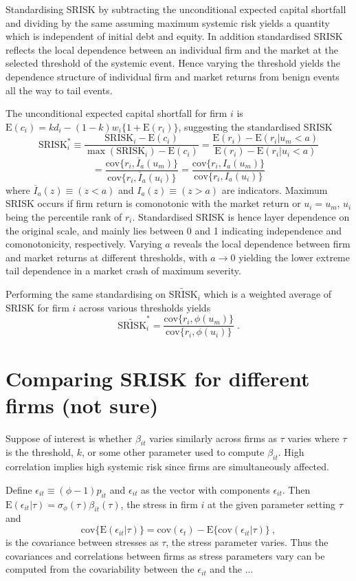\documentclass[authoryear]{elsarticle}
\newcommand{\E}{\mathrm{E}}
\newcommand{\cov}{\mathrm{cov}}
\newcommand{\eps}{\epsilon}
\begin{document}
Standardising SRISK by subtracting the unconditional expected capital shortfall and dividing by the same assuming maximum systemic risk yields a quantity which is independent of initial debt and equity. In addition standardised SRISK reflects the local dependence between an individual firm and the market at the selected threshold of the systemic event. Hence varying the threshold yields the dependence structure of individual firm and market returns from benign events all the way to tail events.

The unconditional expected capital shortfall for firm $i$ is $\E(c_i)=kd_i-(1-k)w_i\{1+\E(r_i)\}$, suggesting the standardised SRISK
$$
\mathrm{SRISK}_i^* \equiv \frac{\mathrm{SRISK}_i-\E(c_i)}{\max(\mathrm{SRISK}_i)-\E(c_i)}
=\frac{\E(r_i)-\E(r_i|u_m<a)}{\E(r_i)-\E(r_i|u_i<a)}
$$
$$
=\frac{\cov\{r_i,\overline{I}_a(u_m)\}}{\cov\{r_i,\overline{I}_a(u_i)\}}
=\frac{\cov\{r_i,I_a(u_m)\}}{\cov\{r_i,I_a(u_i)\}} 
$$
where $\overline{I}_a(z)\equiv (z<a)$ and $I_a(z)\equiv (z>a)$ are indicators. Maximum SRISK occurs if firm return is comonotonic with the market return or $u_i=u_m$, $u_i$ being the percentile rank of $r_i$. Standardised SRISK is hence layer dependence on the original scale, and mainly lies between 0 and 1 indicating independence and comonotonicity, respectively. Varying $a$ reveals the local dependence between firm and market returns at different thresholds, with $a\rightarrow 0$ yielding the lower extreme tail dependence in a market crash of maximum severity.

Performing the same standardising on $\widetilde{\mathrm{SRISK}}_i$ which is a weighted average of SRISK for firm $i$ across various thresholds yields
$$
\widetilde{\mathrm{SRISK}}_i^* = \frac{\cov\{r_i,\phi(u_m)\}}{\cov\{r_i,\phi(u_i)\}}   \;.
$$





\section{Comparing SRISK for different firms (not sure)}

Suppose of interest is whether $\beta_{it}$ varies similarly  across firms as $\tau$ varies where $\tau$ is the threshold, $k$, or some other parameter used to compute $\beta_{it}$. High correlation implies high systemic risk since firms are simultaneously affected.

Define $\eps_{it}\equiv(\phi-1)p_{it}$ and $\eps_{it}$ as the vector with components $\eps_{it}$.  Then $\E(\eps_{it}|\tau)=\sigma_\phi(\tau)\beta_{it}(\tau)$, the stress in firm $i$ at the given parameter setting $\tau$  and
$$
\cov\{\E(\eps_{it}|\tau)\}=\cov(\eps_{t})-\E\{\cov(\eps_{it}|\tau)\}\ ,
$$
is the covariance between stresses as $\tau$, the stress parameter varies.   Thus the covariances and correlations between firms as stress parameters vary can be computed from the covariability between the $\eps_{it}$ and the ...
\end{document}
